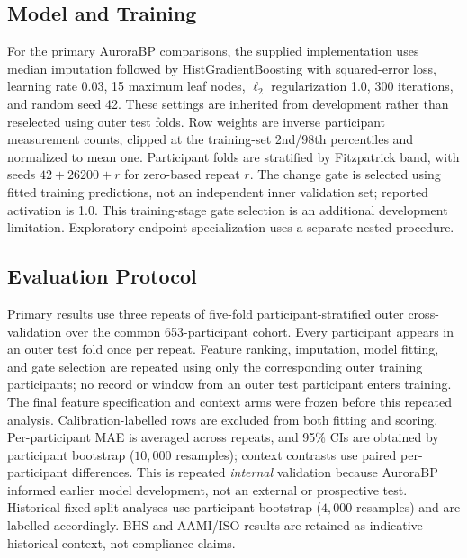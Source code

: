 \documentclass[journal]{IEEEtran}
\begin{document}
\subsection{Model and Training}
For the primary AuroraBP comparisons, the supplied implementation uses median imputation followed by HistGradientBoosting with squared-error loss, learning rate 0.03, 15 maximum leaf nodes, $\ell_2$ regularization 1.0, 300 iterations, and random seed 42. These settings are inherited from development rather than reselected using outer test folds. Row weights are inverse participant measurement counts, clipped at the training-set 2nd/98th percentiles and normalized to mean one. Participant folds are stratified by Fitzpatrick band, with seeds $42+26200+r$ for zero-based repeat $r$. The change gate is selected using fitted training predictions, not an independent inner validation set; reported activation is 1.0. This training-stage gate selection is an additional development limitation. Exploratory endpoint specialization uses a separate nested procedure.
\subsection{Evaluation Protocol}
\label{sec:evalprotocol}
Primary results use three repeats of five-fold participant-stratified outer cross-validation over the common 653-participant cohort. Every participant appears in an outer test fold once per repeat. Feature ranking, imputation, model fitting, and gate selection are repeated using only the corresponding outer training participants; no record or window from an outer test participant enters training. The final feature specification and context arms were frozen before this repeated analysis. Calibration-labelled rows are excluded from both fitting and scoring. Per-participant MAE is averaged across repeats, and 95\% CIs are obtained by participant bootstrap ($10{,}000$ resamples); context contrasts use paired per-participant differences. This is repeated \emph{internal} validation because AuroraBP informed earlier model development, not an external or prospective test. Historical fixed-split analyses use participant bootstrap ($4{,}000$ resamples) and are labelled accordingly. BHS and AAMI/ISO results are retained as indicative historical context, not compliance claims.
\end{document}
